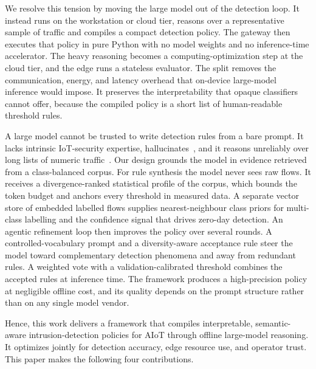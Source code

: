 We resolve this tension by moving the large model out of the detection loop. It instead runs on the workstation or cloud tier, reasons over a representative sample of traffic and compiles a compact detection policy. The gateway then executes that policy in pure Python with no model weights and no inference-time accelerator. The heavy reasoning becomes a computing-optimization step at the cloud tier, and the edge runs a stateless evaluator. The split removes the communication, energy, and latency overhead that on-device large-model inference would impose. It preserves the interpretability that opaque classifiers cannot offer, because the compiled policy is a short list of human-readable threshold rules.

A large model cannot be trusted to write detection rules from a bare prompt. It lacks intrinsic IoT-security expertise, hallucinates~\cite{huang2025hallucination}, and it reasons unreliably over long lists of numeric traffic~\cite{huang2024quantreasoning}. Our design grounds the model in evidence retrieved from a class-balanced corpus. For rule synthesis the model never sees raw flows. It receives a divergence-ranked statistical profile of the corpus, which bounds the token budget and anchors every threshold in measured data. A separate vector store of embedded labelled flows supplies nearest-neighbour class priors for multi-class labelling and the confidence
signal that drives zero-day detection. An agentic refinement loop then improves the policy over several rounds. A controlled-vocabulary prompt and a diversity-aware acceptance rule steer the model toward complementary detection phenomena and away from redundant rules. A weighted vote with a validation-calibrated threshold combines the accepted rules at inference time. The framework produces a high-precision policy at negligible offline cost, and its quality depends on the prompt structure rather than on any single model vendor.

Hence, this work delivers a framework that compiles interpretable, semantic-aware intrusion-detection policies for AIoT through offline large-model reasoning. It optimizes jointly for detection accuracy, edge resource use, and operator trust. This paper makes the following four contributions.

